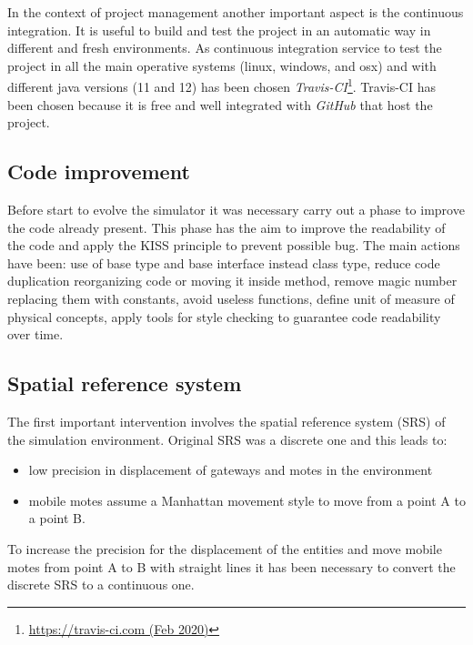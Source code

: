 In the context of project management another important aspect is the continuous integration.
It is useful to build and test the project in an automatic way in different and fresh environments. 
As continuous integration service to test the project in all the main operative systems (linux, windows, and osx) and with different java versions (11 and 12) has been chosen \textit{Travis-CI}\footnote{\href{https://travis-ci.com/}{https://travis-ci.com (Feb 2020)}}.
Travis-CI has been chosen because it is free and well integrated with \textit{GitHub} that host the project.

\subsection{Code improvement}
Before start to evolve the simulator it was necessary carry out a phase to improve the code already present. 
This phase has the aim to improve the readability of the code and apply the KISS principle to prevent possible bug.
The main actions have been: use of base type and base interface instead class type, reduce code duplication reorganizing code or moving it inside method, remove magic number replacing them with constants, avoid useless functions, define unit of measure of physical concepts, apply tools for style checking to guarantee code readability over time.

\subsection{Spatial reference system}
The first important intervention involves the spatial reference system (SRS) of the simulation environment. Original SRS was a discrete one and this leads to:
\begin{itemize}
    \item low precision in displacement of gateways and motes in the environment
    \item mobile motes assume a Manhattan movement style to move from a point A to a point B. 
\end{itemize}  
To increase the precision for the displacement of the entities and move mobile motes from point A to B with straight lines it has been necessary to convert the discrete SRS to a continuous one. 

